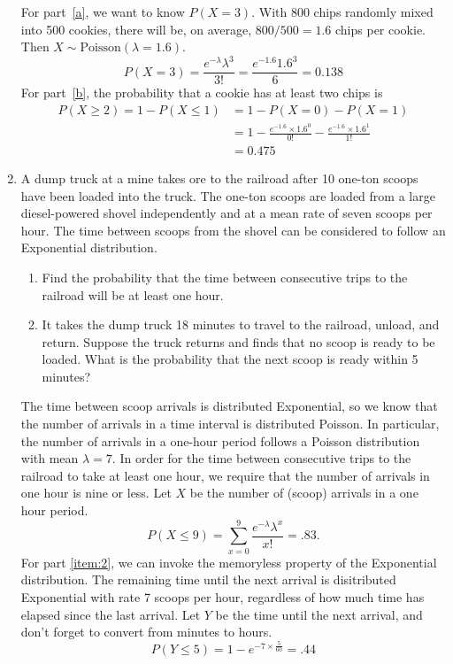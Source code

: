 \begin{enumerate}
\begin{solution}
\bs For part~\ref{a}, we want to know $P(X=3)$.  With 800 chips
randomly mixed into 500 cookies, there will be, on average, $800/500 =
1.6$ chips per cookie.  Then $X \sim \text{Poisson}(\lambda = 1.6)$.
\[
P(X=3) = \frac{e^{-\lambda}\lambda^3}{3!} = \frac{e^{-1.6}1.6^3}{6} = 0.138
\]
For part~\ref{b}, the probability that a cookie has at least two
chips is
\begin{align*}
P(X \geq 2) = 1 - P(X \leq 1) &= 1 - P(X=0) - P(X=1) \\
&= 1 - \frac{e^{-1.6}\times 1.6^0}{0!} - \frac{e^{-1.6}\times 1.6^1}{1!} \\
&= 0.475
\end{align*}
\end{solution}

\item A dump truck at a mine takes ore to the railroad after 10
  one-ton scoops have been loaded into the truck.  The one-ton scoops
  are loaded from a large diesel-powered shovel independently and at a
  mean rate of seven scoops per hour.  The time between scoops from the
  shovel can be considered to follow an Exponential distribution.

\begin{enumerate}
\item Find the probability that the time between consecutive trips to
  the railroad will be at least one hour.
\item It takes the dump truck 18 minutes to travel to the railroad,
  unload, and return. Suppose the truck returns and finds that no
  scoop is ready to be loaded. What is the probability that the next
  scoop is ready within 5 minutes? \label{item:2}
\end{enumerate}

\begin{solution}
  \bs The time between scoop arrivals is distributed Exponential, so
  we know that the number of arrivals in a time interval is
  distributed Poisson. In particular, the number of arrivals in a
  one-hour period follows a Poisson distribution with mean
  $\lambda=7$. In order for the time between consecutive trips to the
  railroad to take at least one hour, we require that the number of
  arrivals in one hour is nine or less. Let $X$ be the number of
  (scoop) arrivals in a one hour period.
\[
P(X \leq 9) = \sum_{x=0}^9 \frac{e^{-\lambda}\lambda^x}{x!} = .83.
\]
For part \ref{item:2}, we can invoke the memoryless property of the
Exponential distribution. The remaining time until the next arrival is
disitributed Exponential with rate 7 scoops per hour, regardless of how
much time has elapsed since the last arrival. Let $Y$ be the time
until the next arrival, and don't forget to convert from minutes to
hours.
\[
P(Y \leq 5) = 1 - e^{-7\times \frac{5}{60}} = .44
\]
\end{solution}


\end{enumerate}
